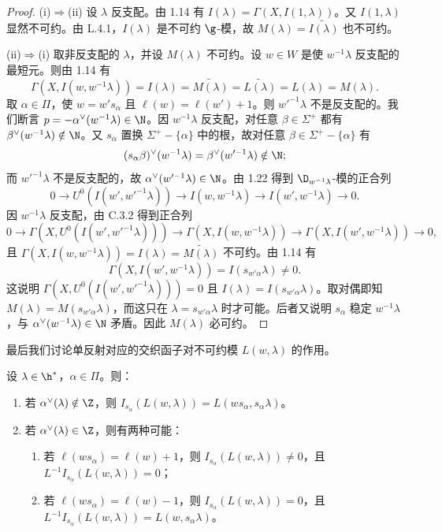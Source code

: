 \begin{proof}
(i)$\Rightarrow$(ii) 设 $\lambda$ 反支配。由 1.14 有 $I(\lambda)=\Gamma(X,I(1,\lambda))$。又 $I(1,\lambda)$ 显然不可约。由 L.4.1，$I(\lambda)$ 是不可约 $\g$-模，故 $M(\lambda)=\widetilde{I(\lambda)}$ 也不可约。

(ii)$\Rightarrow$(i) 取非反支配的 $\lambda$，并设 $M(\lambda)$ 不可约。设 $w\in W$ 是使 $w^{-1}\lambda$ 反支配的最短元。则由 1.14 有
$$\Gamma(X,I(w,w^{-1}\lambda))=I(\lambda)=\widetilde{M(\lambda)}=\widetilde{L(\lambda)}=L(\lambda)=M(\lambda).$$
取 $\alpha\in\Pi$，使 $w=w's_\alpha$ 且 $\ell(w)=\ell(w')+1$。则 $w'^{-1}\lambda$ 不是反支配的。我们断言 $p=-\alpha^\vee(w^{-1}\lambda)\in\N$。因 $w^{-1}\lambda$ 反支配，对任意 $\beta\in\Sigma^+$ 都有 $\beta^\vee(w^{-1}\lambda)\notin\N$。又 $s_\alpha$ 置换 $\Sigma^+-\{\alpha\}$ 中的根，故对任意 $\beta\in\Sigma^+-\{\alpha\}$ 有
$$(s_\alpha\beta)^\vee(w^{-1}\lambda)=\beta^\vee(w'^{-1}\lambda)\notin\N;$$
而 $w'^{-1}\lambda$ 不是反支配的，故 $\alpha^\vee(w'^{-1}\lambda)\in\N$。由 1.22 得到 $\D_{w^{-1}\lambda}$-模的正合列
$$0\longrightarrow U^0(I(w',w'^{-1}\lambda))\longrightarrow I(w,w^{-1}\lambda)\longrightarrow I(w',w^{-1}\lambda)\longrightarrow0.$$
因 $w^{-1}\lambda$ 反支配，由 C.3.2 得到正合列
$$0\to\Gamma(X,U^0(I(w',w'^{-1}\lambda)))\to\Gamma(X,I(w,w^{-1}\lambda))\to\Gamma(X,I(w',w^{-1}\lambda))\to0,$$
且 $\Gamma(X,I(w,w^{-1}\lambda))=I(\lambda)=\widetilde{M(\lambda)}$ 不可约。由 1.14 有
$$\Gamma(X,I(w',w^{-1}\lambda))=I(s_{w'\alpha}\lambda)\neq0.$$
这说明 $\Gamma(X,U^0(I(w',w'^{-1}\lambda)))=0$ 且 $I(\lambda)=I(s_{w'\alpha}\lambda)$。取对偶即知 $M(\lambda)=M(s_{w'\alpha}\lambda)$，而这只在 $\lambda=s_{w'\alpha}\lambda$ 时才可能。后者又说明 $s_\alpha$ 稳定 $w^{-1}\lambda$，与 $\alpha^\vee(w^{-1}\lambda)\in\N$ 矛盾。因此 $M(\lambda)$ 必可约。
\end{proof}

最后我们讨论单反射对应的交织函子对不可约模 $L(w,\lambda)$ 的作用。

\begin{proposition}\label{prop:05.1.25}
设 $\lambda\in\h^*$，$\alpha\in\Pi$。则：
\begin{enumerate}[label=(\roman*)]
\item 若 $\alpha^\vee(\lambda)\notin\Z$，则 $I_{s_\alpha}(L(w,\lambda))=L(ws_\alpha,s_\alpha\lambda)$。
\item 若 $\alpha^\vee(\lambda)\in\Z$，则有两种可能：
\begin{enumerate}[label=(\alph*)]
\item 若 $\ell(ws_\alpha)=\ell(w)+1$，则 $I_{s_\alpha}(L(w,\lambda))\neq0$，且 $L^{-1}I_{s_\alpha}(L(w,\lambda))=0$；
\item 若 $\ell(ws_\alpha)=\ell(w)-1$，则 $I_{s_\alpha}(L(w,\lambda))=0$，且 $L^{-1}I_{s_\alpha}(L(w,\lambda))=L(w,s_\alpha\lambda)$。
\end{enumerate}
\end{enumerate}
\end{proposition}

